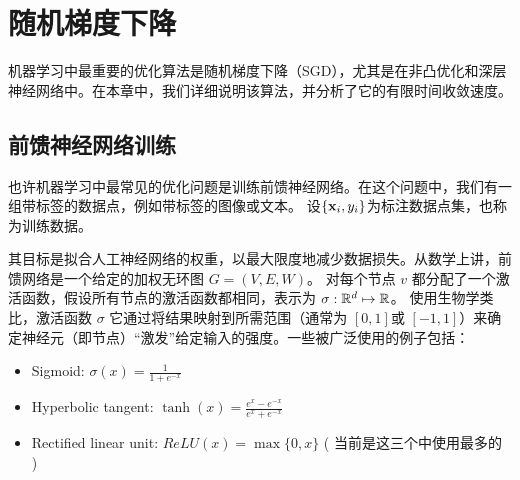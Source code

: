 \chapter{
    随机梯度下降
    } \label{chapter:SGD}


机器学习中最重要的优化算法是随机梯度下降（SGD），尤其是在非凸优化和深层神经网络中。在本章中，我们详细说明该算法，并分析了它的有限时间收敛速度。

\section{
    前馈神经网络训练
    }

也许机器学习中最常见的优化问题是训练前馈神经网络。在这个问题中，我们有一组带标签的数据点，例如带标签的图像或文本。
设$\{\mathbf x_i,y_i\}$为标注数据点集，也称为训练数据。

其目标是拟合人工神经网络的权重，以最大限度地减少数据损失。从数学上讲，前馈网络是一个给定的加权无环图 $G=(V,E,W)$。
对每个节点 $v$ 都分配了一个激活函数，假设所有节点的激活函数都相同，表示为 $\sigma: {\mathbb R}^d \mapsto {\mathbb R}$。
使用生物学类比，激活函数 $\sigma$ 它通过将结果映射到所需范围（通常为 $[0,1]$或 $[-1,1]$）来确定神经元（即节点）“激发”给定输入的强度。一些被广泛使用的例子包括：
\begin{itemize}
\item Sigmoid: $\sigma(x) = \frac{1}{1 + e^{-x}}$
\item Hyperbolic tangent: $\tanh(x) = \displaystyle\frac{e^x - e^{-x}}{e^x + e^{-x}}$
\item Rectified linear unit: $ReLU(x) = \max\{0, x\}$ (
当前是这三个中使用最多的
) 
\end{itemize}

